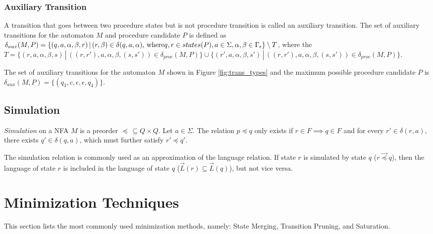         \subsubsection*{Auxiliary Transition}
            A transition that goes between two procedure states but is not procedure transition is called an auxiliary transition. The set of auxiliary transitions for the automaton $M$ and procedure candidate $P$ is defined as $\delta_{aux}(M, P) = \{(q, a, \alpha, \beta, r)\,|\,(r, \beta)\in\delta(q, a, \alpha)\textnormal{, where}\\ q, r \in states(P), a\in\Sigma, \alpha, \beta\in\Gamma_\epsilon\}\setminus T$, where the $T = \{(r,a,\alpha,\beta,s)\,|\,((r, r'), a, \alpha, \beta, (s, s')) \in \delta_{proc}(M, P)\} \cup \{(r',a, \alpha, \beta, s')\,|\,((r, r'), a, \alpha, \beta, (s, s')) \in \delta_{proc}(M, P)\}$.

            The set of auxiliary transitions for the automaton $M$ shown in Figure \ref{fig:trans_types} and the maximum possible procedure candidate $P$ is $\delta_{aux}(M, P) = \{(q_3, c, \epsilon, \epsilon, q_4)\}$.

    \subsection{Simulation}
        \textit{Simulation}\cite{Computing_simulaitons, When_simulation_meets_antichains} on a NFA $M$ is a preorder $\preceq\, \subseteq Q \times Q$. Let $a \in \Sigma$. The relation $p \preceq q$ only exists if $r \in F \implies q \in F$ and for every $r' \in \delta(r, a)$, there exists $q' \in \delta(q, a)$, which must further satisfy $r' \preceq q'$.

        The simulation relation is commonly used as an approximation of the language relation. If state $r$ is simulated by state $q$ ($r \overrightarrow{\preceq} q$), then the language of state $r$ is included in the language of state $q$ ($\overrightarrow{L}(r) \subseteq \overrightarrow{L}(q)$), but not vice versa.


\section{Minimization Techniques}
    This section lists the most commonly used minimization methods, namely: State Merging, Transition Pruning, and Saturation.

